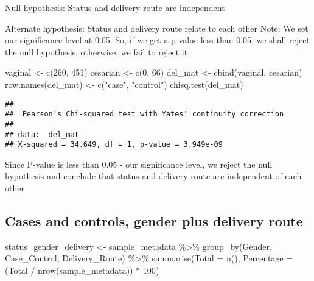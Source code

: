 \documentclass[
]{article}
\newenvironment{Shaded}{\begin{snugshade}}{\end{snugshade}}
\newcommand{\AttributeTok}[1]{\textcolor[rgb]{0.77,0.63,0.00}{#1}}
\newcommand{\DecValTok}[1]{\textcolor[rgb]{0.00,0.00,0.81}{#1}}
\newcommand{\FunctionTok}[1]{\textcolor[rgb]{0.00,0.00,0.00}{#1}}
\newcommand{\NormalTok}[1]{#1}
\newcommand{\OtherTok}[1]{\textcolor[rgb]{0.56,0.35,0.01}{#1}}
\newcommand{\SpecialCharTok}[1]{\textcolor[rgb]{0.00,0.00,0.00}{#1}}
\newcommand{\StringTok}[1]{\textcolor[rgb]{0.31,0.60,0.02}{#1}}
\begin{document}
Null hypothesis: Status and delivery route are independent

Alternate hypothesis: Status and delivery route relate to each other
Note: We set our significance level at 0.05. So, if we get a p-value
less than 0.05, we shall reject the null hypothesis, otherwise, we fail
to reject it.

\begin{Shaded}
\begin{Highlighting}[]
\NormalTok{vaginal }\OtherTok{\textless{}{-}} \FunctionTok{c}\NormalTok{(}\DecValTok{260}\NormalTok{, }\DecValTok{451}\NormalTok{)}
\NormalTok{cesarian }\OtherTok{\textless{}{-}} \FunctionTok{c}\NormalTok{(}\DecValTok{0}\NormalTok{, }\DecValTok{66}\NormalTok{)}
\NormalTok{del\_mat }\OtherTok{\textless{}{-}} \FunctionTok{cbind}\NormalTok{(vaginal, cesarian)}
\FunctionTok{row.names}\NormalTok{(del\_mat) }\OtherTok{\textless{}{-}} \FunctionTok{c}\NormalTok{(}\StringTok{"case"}\NormalTok{, }\StringTok{"control"}\NormalTok{)}
\FunctionTok{chisq.test}\NormalTok{(del\_mat)}
\end{Highlighting}
\end{Shaded}

\begin{verbatim}
## 
##  Pearson's Chi-squared test with Yates' continuity correction
## 
## data:  del_mat
## X-squared = 34.649, df = 1, p-value = 3.949e-09
\end{verbatim}

Since P-value is less than 0.05 - our significance level, we reject the
null hypothesis and conclude that status and delivery route are
independent of each other

\hypertarget{cases-and-controls-gender-plus-delivery-route}{%
\subsection{Cases and controls, gender plus delivery
route}\label{cases-and-controls-gender-plus-delivery-route}}

\begin{Shaded}
\begin{Highlighting}[]
\NormalTok{status\_gender\_delivery }\OtherTok{\textless{}{-}}\NormalTok{ sample\_metadata }\SpecialCharTok{\%\textgreater{}\%} 
  \FunctionTok{group\_by}\NormalTok{(Gender, Case\_Control, Delivery\_Route) }\SpecialCharTok{\%\textgreater{}\%} 
  \FunctionTok{summarise}\NormalTok{(}\AttributeTok{Total =} \FunctionTok{n}\NormalTok{(), }\AttributeTok{Percentage =}\NormalTok{ (Total }\SpecialCharTok{/} \FunctionTok{nrow}\NormalTok{(sample\_metadata)) }\SpecialCharTok{*} \DecValTok{100}\NormalTok{)}
\end{Highlighting}
\end{Shaded}
\end{document}
